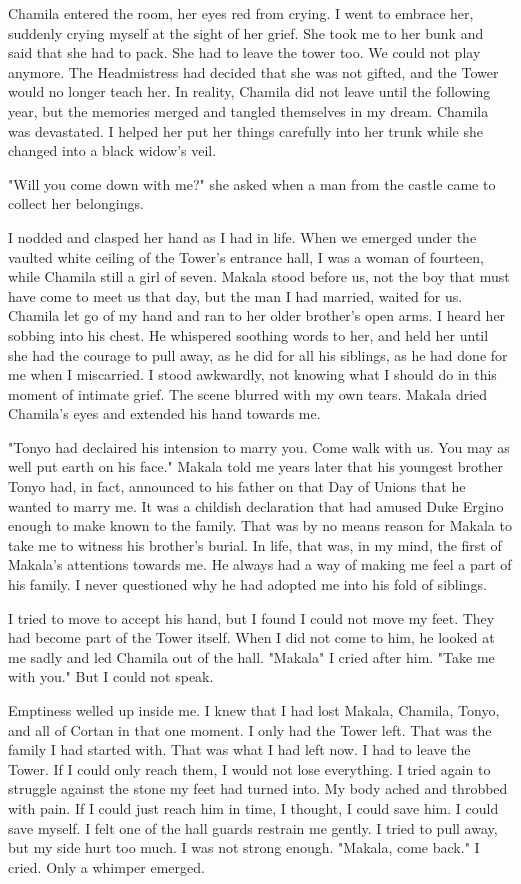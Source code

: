 \documentclass{article}
\begin{document}
Chamila entered the room, her eyes red from crying. I went to embrace her, suddenly crying myself at the sight of her grief. She took me to her bunk and said that she had to pack. She had to leave the tower too. We could not play anymore. The Headmistress had decided that she was not gifted, and the Tower would no longer teach her. In reality, Chamila did not leave until the following year, but the memories merged and tangled themselves in my dream. Chamila was devastated. I helped her put her things carefully into her trunk while she changed into a black widow's veil. 

"Will you come down with me?" she asked when a man from the castle came to collect her belongings.

I nodded and clasped her hand as I had in life. When we emerged under the vaulted white ceiling of the Tower's entrance hall, I was a woman of fourteen, while Chamila still a girl of seven. Makala stood before us, not the boy that must have come to meet us that day, but the man I had married, waited for us. Chamila let go of my hand and ran to her older brother's open arms. I heard her sobbing into his chest. He whispered soothing words to her, and held her until she had the courage to pull away, as he did for all his siblings, as he had done for me when I miscarried. I stood awkwardly, not knowing what I should do in this moment of intimate grief. The scene blurred with my own tears. Makala dried Chamila's eyes and extended his hand towards me. 

"Tonyo had declaired his intension to marry you. Come walk with us. You may as well put earth on his face." Makala told me years later that his youngest brother Tonyo had, in fact, announced to his father on that Day of Unions that he wanted to marry me. It was a childish declaration that had amused Duke Ergino enough to make known to the family. That was by no means reason for Makala to take me to witness his brother's burial. In life, that was, in my mind, the first of Makala's attentions towards me. He always had a way of making me feel a part of his family. I never questioned why he had adopted me into his fold of siblings.

I tried to move to accept his hand, but I found I could not move my feet. They had become part of the Tower itself. When I did not come to him, he looked at me sadly and led Chamila out of the hall. "Makala" I cried after him. "Take me with you." But I could not speak. 

Emptiness welled up inside me. I knew that I had lost Makala, Chamila, Tonyo, and all of Cortan in that one moment. I only had the Tower left. That was the family I had started with. That was what I had left now. I had to leave the Tower. If I could only reach them, I would not lose everything. I tried again to  struggle against the stone my feet had turned into. My body ached and throbbed with pain. If I could just reach him in time, I thought, I could save him. I could save myself. I felt one of the hall guards restrain me gently. I tried to pull away, but my side hurt too much. I was not strong enough. "Makala, come back." I cried. Only a whimper emerged. 
\end{document}
